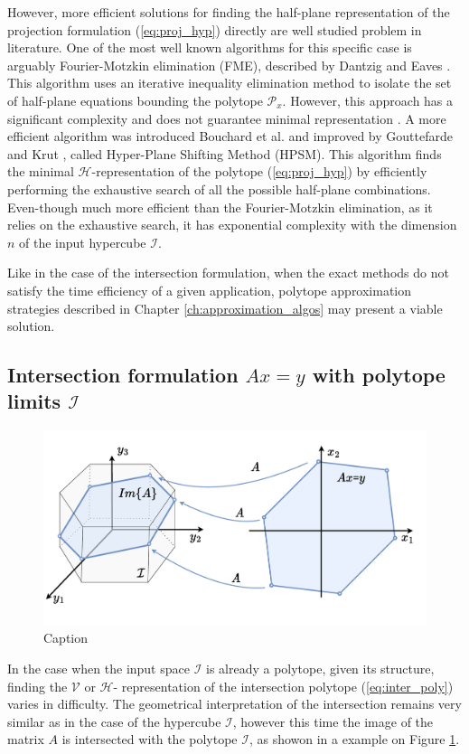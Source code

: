 However, more efficient solutions for finding the half-plane representation of the projection formulation (\ref{eq:proj_hyp}) directly are well studied problem in literature. One of the most well known algorithms for this specific case is arguably Fourier-Motzkin elimination (FME), described by Dantzig and Eaves \cite{dantzig1973fourier}. This algorithm uses an iterative inequality elimination method to isolate the set of half-plane equations bounding the polytope $\mathcal{P}_x$. However, this approach has a significant complexity and does not guarantee minimal representation \cite{Monniaux2010}. 
A more efficient algorithm was introduced Bouchard et al. \cite{Bouchard2009} and improved by Gouttefarde and Krut \cite{hyper_psm}, called Hyper-Plane Shifting Method (HPSM). This algorithm finds the minimal $\mathcal{H}$-representation of the polytope (\ref{eq:proj_hyp}) by efficiently performing the exhaustive search of all the possible half-plane combinations. Even-though much more efficient than the Fourier-Motzkin elimination, as it relies on the exhaustive search, it has exponential complexity with the dimension $n$ of the input hypercube $\mathcal{I}$.

Like in the case of the intersection formulation, when the exact methods do not satisfy the time efficiency of a given application, polytope approximation strategies described in Chapter \ref{ch:approximation_algos} may present a viable solution. 

\subsection{Intersection formulation $Ax=y$ with polytope limits $\mathcal{I}$}

\begin{figure}[h]
    \centering
    \includegraphics[width=0.7\linewidth]{Chapters/imgs/inter_poly.pdf}
    \caption{Caption}
    \label{fig:inter_poly}
\end{figure}

In the case when the input space $\mathcal{I}$ is already a polytope, given its structure, finding the $\mathcal{V}$ or $\mathcal{H}$- representation of the intersection polytope (\ref{eq:inter_poly}) varies in difficulty. The geometrical interpretation of the intersection remains very similar as in the case of the hypercube $\mathcal{I}$, however this time the image of the matrix $A$ is intersected with the polytope $\mathcal{I}$, as showon in a example on Figure \ref{fig:inter_poly}.

